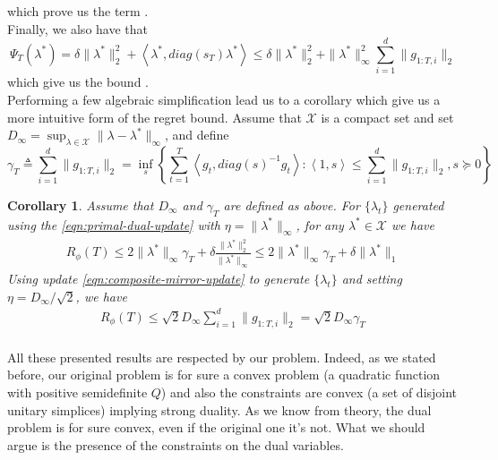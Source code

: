 \documentclass[notitlepage]{article}
\newcommand*\circled[1]{\tikz[baseline=(char.base)]{\node[shape=circle,draw,inner sep=2pt] (char) {#1};}}
\newtheorem{corollary}{Corollary}[section]
\begin{document}
which prove us the term \circled{3}.\\
Finally, we also have that
\[ \Psi_T(\lambda^*) = \delta \|\lambda^*\|_2^2 + \left\langle \lambda^*, diag(s_T) \lambda^* \right\rangle \le \delta \|\lambda^*\|_2^2 + \|\lambda^*\|_\infty^2 \sum_{i=1}^d \|g_{1:T,i}\|_2 \]
which give us the bound \circled{1}.\\
Performing a few algebraic simplification lead us to a corollary which give us a more intuitive form of the regret bound. Assume that $\mathcal{X}$ is a compact set and set $D_\infty = \sup_{\lambda \in \mathcal{X}} \| \lambda - \lambda^* \|_\infty$, and define
\[ \gamma_T \triangleq \sum_{i=1}^d \| g_{1:T,i} \|_2 = \inf_s \left\lbrace \sum_{t=1}^T \left\langle g_t,diag(s)^{-1} g_t \right\rangle : \left\langle 1,s \right\rangle \le \sum_{i=1}^d \| g_{1:T,i} \|_2, s \succeq 0 \right\rbrace \]
\begin{corollary}
  Assume that $D_\infty$ and $\gamma_T$ are defined as above. For $\{ \lambda_t \}$ generated using the \eqref{eqn:primal-dual-update} with $\eta = \|\lambda^*\|_\infty$, for any $\lambda^* \in \mathcal{X}$ we have
  \begin{align*}
    R_\phi(T) \le 2 \|\lambda^*\|_\infty \gamma_T + \delta \frac{\|\lambda^*\|_2^2}{\|\lambda^*\|_\infty} \le 2 \|\lambda^*\|_\infty \gamma_T + \delta \|\lambda^*\|_1
  \end{align*}
  Using update \eqref{eqn:composite-mirror-update} to generate $\{\lambda_t\}$ and setting $\eta = D_\infty / \sqrt{2}$, we have
  \begin{align*}
    R_\phi(T) \le \sqrt{2} D_\infty \sum_{i=1}^d \| g_{1:T,i} \|_2 = \sqrt{2} D_\infty \gamma_T \\[1em]
  \end{align*}
\end{corollary}
All these presented results are respected by our problem. Indeed, as we stated before, our original problem is for sure a convex problem (a quadratic function with positive semidefinite $Q$) and also the constraints are convex (a set of disjoint 
unitary simplices) implying strong duality. As we know from theory, the dual problem is for sure convex, even if the original one it's not. What we should argue is the presence of the constraints on the dual variables.\\
\end{document}
